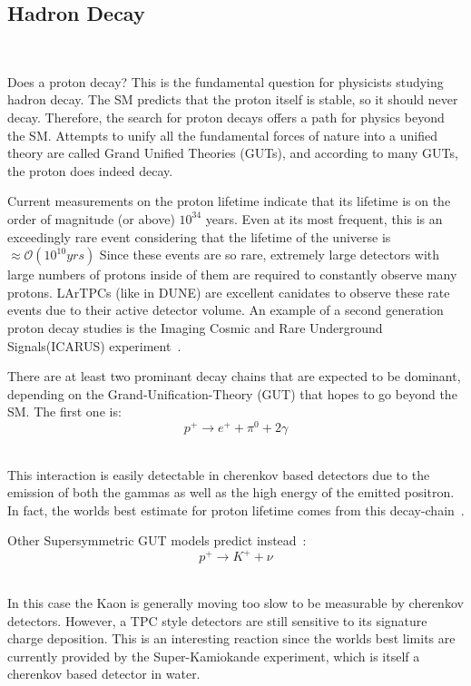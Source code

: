 \subsection{Hadron Decay}~\label{sec:hadron_decay}

Does a proton decay?
This is the fundamental question for physicists studying hadron decay.
The SM predicts that the proton itself is stable, so it should never decay.
Therefore, the search for proton decays offers a path for physics beyond the SM.
Attempts to unify all the fundamental forces of nature into a unified theory are called Grand Unified Theories (GUTs), and according to many GUTs, the proton does indeed decay.

Current measurements on the proton lifetime indicate that its lifetime is on the order of magnitude (or above) $10^{34}$ years.
Even at its most frequent, this is an exceedingly rare event considering that the lifetime of the universe is $\approx \mathcal{O}(10^{10} yrs)$
Since these events are so rare, extremely large detectors with large numbers of protons inside of them are required to constantly observe many protons.
LArTPCs (like in DUNE) are excellent canidates to observe these rate events due to their active detector volume.
An example of a second generation proton decay studies is the Imaging Cosmic and Rare Underground Signals(ICARUS) experiment~\citep{ICARUS_2001}.

There are at least two prominant decay chains that are expected to be dominant, depending on the Grand-Unification-Theory (GUT) that hopes to go beyond the SM.
The first one is:
\begin{equation}
  p^{+} \rightarrow e^{+} + \pi^{0} + 2 \gamma
\end{equation}
~\label{eq:rxn_proton_decay1}

This interaction is easily detectable in cherenkov based detectors due to the emission of both the gammas as well as the high energy of the emitted positron.
In fact, the worlds best estimate for proton lifetime comes from this decay-chain~\citep{PhysRevD.95.012004}.

Other Supersymmetric GUT models predict instead~\citep{PhysRevD.38.1479}:
\begin{equation}
  p^{+} \rightarrow K^{+} + \nu
\end{equation}
~\label{eq:rxn_proton_decay2}

In this case the Kaon is generally moving too slow to be measurable by cherenkov detectors.
However, a TPC style detectors are still sensitive to its signature charge deposition.
This is an interesting reaction since the worlds best limits are currently provided by the Super-Kamiokande experiment, which is itself a cherenkov based detector in water.

